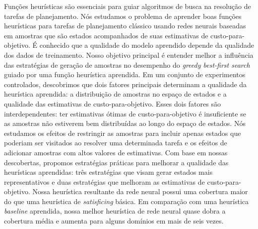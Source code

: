 \begin{translatedabstract}
    Funções heurísticas são essenciais para guiar algoritmos de busca na resolução de tarefas de planejamento.
    Nós estudamos o problema de aprender boas funções heurísticas para tarefas de planejamento clássico usando redes neurais baseadas em amostras que são estados acompanhados de suas estimativas de custo-para-objetivo. É conhecido que a qualidade do modelo aprendido depende da qualidade dos dados de treinamento. Nosso objetivo principal é entender melhor a influência das estratégias de geração de amostras no desempenho do \emph{greedy best-first search} guiado por uma função heurística aprendida.
    Em um conjunto de experimentos controlados, descobrimos que dois fatores principais determinam a qualidade da heurística aprendida: a distribuição de amostras no espaço de estados e a qualidade das estimativas de custo-para-objetivo. Esses dois fatores são interdependentes: ter estimativas ótimas de custo-para-objetivo é insuficiente se as amostras não estiverem bem distribuídas ao longo do espaço de estados.
    Nós estudamos os efeitos de restringir as amostras para incluir apenas estados que poderiam ser visitados ao resolver uma determinada tarefa e os efeitos de adicionar amostras com altos valores de estimativas.
    Com base em nossas descobertas, propomos estratégias práticas para melhorar a qualidade das heurísticas aprendidas: três estratégias que visam gerar estados mais representativos e duas estratégias que melhoram as estimativas de custo-para-objetivo.
    Nossa heurística resultante da rede neural possui uma cobertura maior do que uma heurística de \emph{satisficing} básica. Em comparação com uma heurística \emph{baseline} aprendida, nossa melhor heurística de rede neural quase dobra a cobertura média e aumenta para alguns domínios em mais de seis vezes.
\end{translatedabstract}
